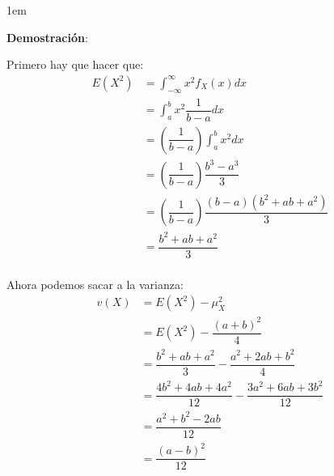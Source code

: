 \documentclass[12pt, fleqn]{report}                             %
\newenvironment{SmallIndentation}[1][0.75em]                    %
        {\begin{adjustwidth}{#1}{}\begin{footnotesize}}             %
        {\end{footnotesize}\end{adjustwidth}}                       %
\theoremstyle{break}                                            %
\newcommand{\Wrap}[1]{\left( #1 \right)}                        %
\newcommand{\pfrac}[2]{\Wrap{\dfrac{#1}{#2}}}                   %
\begin{document}
                \begin{SmallIndentation}[1em]
                    \textbf{Demostración}:
                    
                    Primero hay que hacer que:
                    \begin{align*}
                        E(X^2) 
                            &= \int_{-\infty}^\infty x^2 f_X (x) dx                 \\
                            &= \int_a^b x^2 \dfrac{1}{b-a} dx                       \\
                            &= \pfrac{1}{b-a} \int_a^b x^2 dx                       \\
                            &= \pfrac{1}{b-a} \dfrac{b^3 - a^3}{3}                  \\
                            &= \pfrac{1}{b-a} \dfrac{(b-a)(b^2 + ab + a^2)}{3}      \\
                            &= \dfrac{b^2 + ab + a^2}{3}                            \\
                    \end{align*}

                    Ahora podemos sacar a la varianza:
                    \begin{align*}
                        v(X)
                            &= E(X^2) -\mu_X^2                                              \\
                            &= E(X^2) -\dfrac{(a+b)^2}{4}                                   \\
                            &= \dfrac{b^2 + ab + a^2}{3} -\dfrac{a^2+ 2ab + b^2}{4}         \\
                            &= \dfrac{4b^2 + 4ab + 4a^2}{12} -\dfrac{3a^2+ 6ab + 3b^2}{12}  \\
                            &= \dfrac{a^2 + b^2 - 2ab}{12}                                  \\
                            &= \dfrac{(a-b)^2}{12} 
                    \end{align*}
                
                \end{SmallIndentation}
                    

                   

            \clearpage
\end{document}
